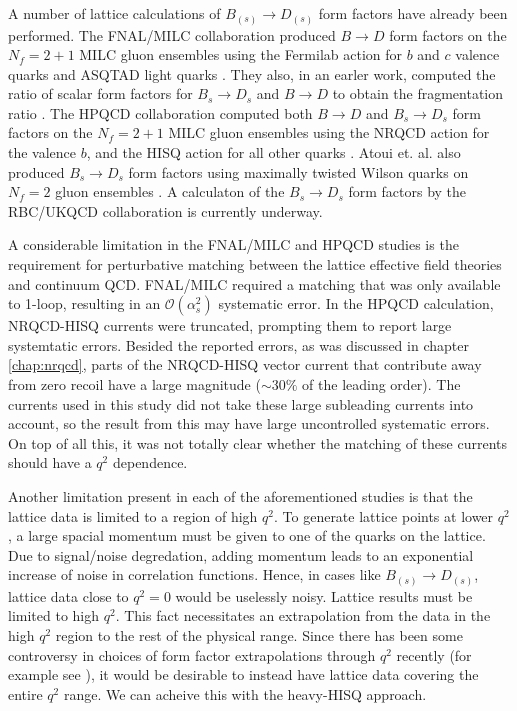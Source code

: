 A number of lattice calculations of $B_{(s)} \to D_{(s)}$ form factors have already been performed. The FNAL/MILC collaboration produced $B\to D$ form factors on the $N_f=2+1$ MILC gluon ensembles using the Fermilab action for $b$ and $c$ valence quarks and ASQTAD light quarks \cite{Lattice:2015rga}. They also, in an earler work, computed the ratio of scalar form factors for $B_s\to D_s$ and $B\to D$ to obtain the fragmentation ratio \cite{PhysRevD.85.114502}. The HPQCD collaboration computed both $B\to D$ and $B_s\to D_s$ form factors on the $N_f=2+1$ MILC gluon ensembles using the NRQCD action for the valence $b$, and the HISQ action for all other quarks \cite{Na:2015kha,Monahan:2017uby}. Atoui et. al. also produced $B_s\to D_s$ form factors using maximally twisted Wilson quarks on $N_f=2$ gluon ensembles \cite{Atoui2014}. A calculaton of the $B_s\to D_s$ form factors by the RBC/UKQCD collaboration is currently underway.

A considerable limitation in the FNAL/MILC and HPQCD studies is the requirement for perturbative matching between the lattice effective field theories and continuum QCD. FNAL/MILC required a matching that was only available to 1-loop, resulting in an $\mathcal{O}(\alpha_s^2)$ systematic error. In the HPQCD calculation, NRQCD-HISQ currents were truncated, prompting them to report large systemtatic errors. Besided the reported errors, as was discussed in chapter \ref{chap:nrqcd}, parts of the NRQCD-HISQ vector current that contribute away from zero recoil have a large magnitude ($\sim 30\%$ of the leading order). The currents used in this study did not take these large subleading currents into account, so the result from this may have large uncontrolled systematic errors. On top of all this, it was not totally clear whether the matching of these currents should have a $q^2$ dependence.

Another limitation present in each of the aforementioned studies is that the lattice data is limited to a region of high $q^2$. To generate lattice points at lower $q^2$, a large spacial momentum must be given to one of the quarks on the lattice. Due to signal/noise degredation, adding momentum leads to an exponential increase of noise in correlation functions. Hence, in cases like $B_{(s)}\to D_{(s)}$, lattice data close to $q^2=0$ would be uselessly noisy. Lattice results must be limited to high $q^2$. This fact necessitates an extrapolation from the data in the high $q^2$ region to the rest of the physical range. Since there has been some controversy in choices of form factor extrapolations through $q^2$ recently (for example see \cite{Bigi:2017njr,Grinstein:2017nlq}), it would be desirable to instead have lattice data covering the entire $q^2$ range. We can acheive this with the heavy-HISQ approach.


